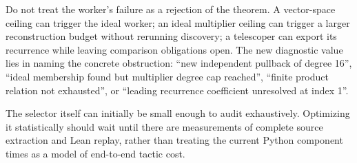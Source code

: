 Do not treat the worker's failure as a rejection of the theorem. A vector-space ceiling can trigger the ideal worker; an ideal multiplier ceiling can trigger a larger reconstruction budget without rerunning discovery; a telescoper can export its recurrence while leaving comparison obligations open. The new diagnostic value lies in naming the concrete obstruction: ``new independent pullback of degree 16'', ``ideal membership found but multiplier degree cap reached'', ``finite product relation not exhausted'', or ``leading recurrence coefficient unresolved at index 1''.

The selector itself can initially be small enough to audit exhaustively. Optimizing it statistically should wait until there are measurements of complete source extraction and Lean replay, rather than treating the current Python component times as a model of end-to-end tactic cost.
